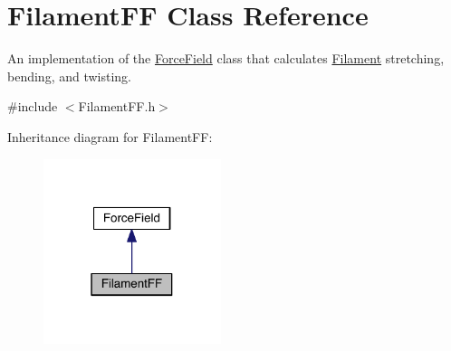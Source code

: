 \hypertarget{classFilamentFF}{\section{Filament\+F\+F Class Reference}
\label{classFilamentFF}
}


An implementation of the \hyperlink{classForceField}{Force\+Field} class that calculates \hyperlink{classFilament}{Filament} stretching, bending, and twisting.  




{\ttfamily \#include $<$Filament\+F\+F.\+h$>$}



Inheritance diagram for Filament\+F\+F\+:\nopagebreak
\begin{figure}[H]
\begin{center}
\leavevmode
\includegraphics[width=147pt]{classFilamentFF__inherit__graph}
\end{center}
\end{figure}


